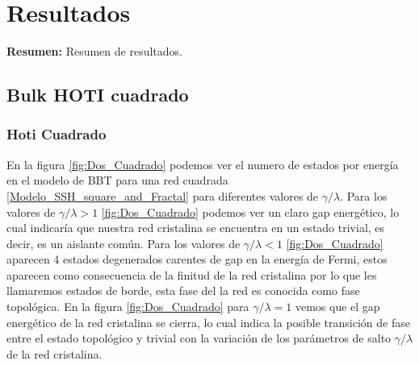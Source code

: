 \chapter{Resultados}

\begin{center}
\begin{minipage}{0.9\textwidth}
{\small
{\bf Resumen:} Resumen de resultados.
}
\end{minipage}
\end{center}

\section{Bulk HOTI cuadrado}



\subsection{Hoti Cuadrado}

En la figura \ref{fig:Dos_Cuadrado} podemos ver el numero de estados por energía en el modelo de BBT para una red cuadrada \ref{Modelo_SSH_square_and_Fractal} para diferentes valores de $\gamma/\lambda$. Para los valores de $\gamma/\lambda>1$ \ref{fig:Dos_Cuadrado}  podemos ver un claro gap energético, lo cual indicaría que nuestra red cristalina se encuentra en un estado trivial, es decir, es un aislante común. Para los valores de $\gamma/\lambda<1$ \ref{fig:Dos_Cuadrado}  aparecen 4 estados degenerados carentes de gap en la energía de Fermi, estos aparecen como consecuencia de la finitud de la red cristalina por lo que les llamaremos estados de borde, esta fase del la red es conocida como fase topológica. En la figura \ref{fig:Dos_Cuadrado} para   $\gamma/\lambda = 1$ vemos que el gap energético de la red cristalina se cierra, lo cual indica la posible transición de fase entre el estado topológico y trivial con la variación de los parámetros de salto $\gamma/\lambda$ de la red cristalina.


